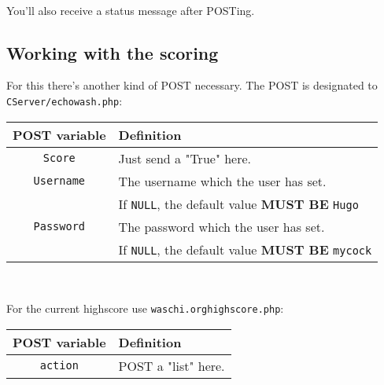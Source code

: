 \documentclass[letterpaper,twoside]{scrartcl}
\begin{document}
   \\
   \newline
   You'll also receive a status message after POSTing.\newline\newline


 \newpage


  \subsection{Working with the scoring}
   For this there's another kind of POST necessary.\newline
   The POST is designated to \texttt{CServer/echowash.php}:\newline\newline
   \begin{tabular}[ht]{|c|l|}
    \hline
    POST variable & Definition\\
    \hline\hline
    \texttt{Score} & Just send a "True" here.\\
    \hline
    \texttt{Username} & The username which the user has set.\\
 		   & If \texttt{NULL}, the default value \textbf{MUST BE} \texttt{Hugo}\\
    \hline
    \texttt{Password} & The password which the user has set.\\
		   & If \texttt{NULL}, the default value \textbf{MUST BE} \texttt{mycock}\\
    \hline
   \end{tabular}
   \\
   \newline

   For the current highscore use \texttt{waschi.org\/highscore.php}:\newline\newline
   \begin{tabular}[ht]{|c|l|}
    \hline
    POST variable & Definition\\
    \hline\hline
    \texttt{action} & POST a "list" here.\\
    \hline
   \end{tabular}
   \\
\end{document}
